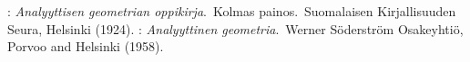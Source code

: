 \documentclass[12pt]{article}
\begin{document}
\begin{thebibliography}{8}
: {\em Analyyttisen geometrian oppikirja}.\, Kolmas painos.\, Suomalaisen Kirjallisuuden Seura, Helsinki (1924).
: {\em Analyyttinen geometria}.\, Werner S\"oderstr\"om Osakeyhti\"o, Porvoo and Helsinki (1958).
\end{thebibliography}

\end{document}

